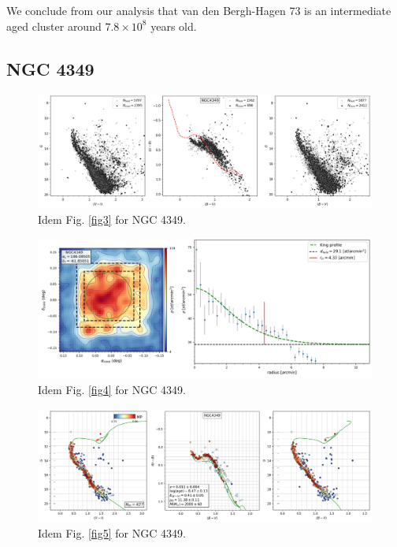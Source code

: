 \documentclass[draft]{aa}
\begin{document}
We conclude from our analysis that van den Bergh-Hagen 73 is an intermediate
aged cluster around $7.8\times10^8$ years old.



\subsection{NGC 4349}

\begin{figure}[ht]
    \centering
    \includegraphics[width=\hsize]{../figs/obs_NGC4349.png}
    \caption{Idem Fig. \ref{fig3} for NGC 4349.}
    \label{fig63}
\end{figure}
\begin{figure}[ht]
    \centering
    \includegraphics[width=\hsize]{../figs/dmap_ngc4349.png}
    \caption{Idem Fig. \ref{fig4} for NGC 4349.}
    \label{fig64}
\end{figure}
\begin{figure}[ht]
    \centering
    \includegraphics[width=\hsize]{../figs/cmds_ngc4349.png}
    \caption{Idem Fig. \ref{fig5} for NGC 4349.}
    \label{fig65}
\end{figure}
\end{document}
